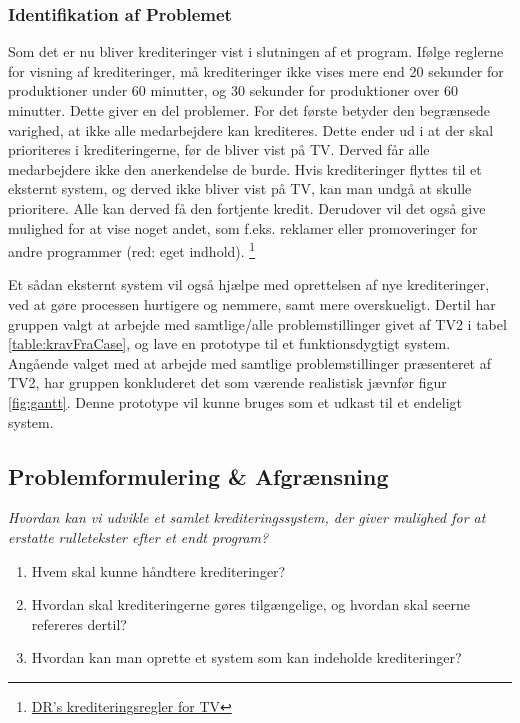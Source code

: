 \subsubsection{Identifikation af Problemet}
Som det er nu bliver krediteringer vist i slutningen af et program. Ifølge reglerne for visning af krediteringer, må krediteringer ikke vises mere end 20 sekunder for produktioner under 60 minutter, og 30 sekunder for produktioner over 60 minutter. Dette giver en del problemer. For det første betyder den begrænsede varighed, at ikke alle medarbejdere kan krediteres. Dette ender ud i at der skal prioriteres i krediteringerne, før de bliver vist på TV. Derved får alle medarbejdere ikke den anerkendelse de burde.
Hvis krediteringer flyttes til et eksternt system, og derved ikke bliver vist på TV, kan man undgå at skulle prioritere. Alle kan derved få den fortjente kredit. Derudover vil det også give mulighed for at vise noget andet, som f.eks. reklamer eller promoveringer for andre programmer (red: eget indhold).
\footnote{\href{https://www.dr.dk/NR/rdonlyres/00221a7b/dpikscstjptklixxdnjgywgeuakhwpog/DR_kreditmanual_050810.pdf}{DR’s krediteringsregler for TV}}

\noindent
Et sådan eksternt system vil også hjælpe med oprettelsen af nye krediteringer, ved at gøre processen hurtigere og nemmere, samt mere overskueligt. Dertil har gruppen valgt at arbejde med samtlige/alle problemstillinger givet af TV2 i tabel \ref{table:kravFraCase}, og lave en prototype til et funktionsdygtigt system. Angående valget med at arbejde med samtlige problemstillinger præsenteret af TV2, har gruppen konkluderet det som værende realistisk jævnfør figur \ref{fig:gantt}. Denne prototype vil kunne bruges som et udkast til et endeligt system.

\subsection{Problemformulering \& Afgrænsning}
\textit{Hvordan kan vi udvikle et samlet krediteringssystem, der giver mulighed for at erstatte rulletekster efter et endt program?}

\begin{enumerate}
    \item Hvem skal kunne håndtere krediteringer?
    \item Hvordan skal krediteringerne gøres tilgængelige, og hvordan skal seerne refereres dertil?
    \item Hvordan kan man oprette et system som kan indeholde krediteringer?
\end{enumerate}

